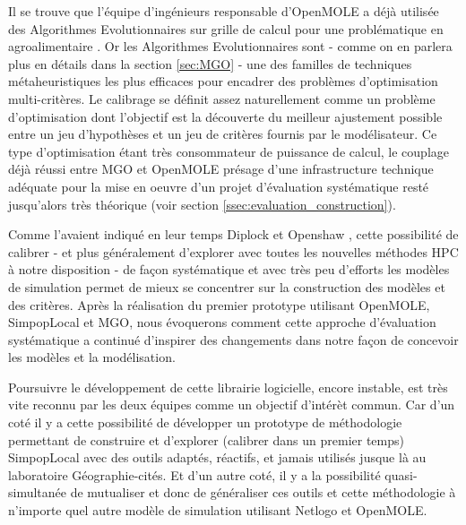 Il se trouve que l'équipe d'ingénieurs responsable d'OpenMOLE a déjà utilisée des Algorithmes Evolutionnaires sur grille de calcul pour une problématique en agroalimentaire \autocite{Mesmoudi2010}. Or les Algorithmes Evolutionnaires sont - comme on en parlera plus en détails dans la section \ref{sec:MGO} - une des familles de techniques métaheuristiques les plus efficaces pour encadrer des problèmes d'optimisation multi-critères. Le calibrage se définit assez naturellement comme un problème d'optimisation dont l'objectif est la découverte du meilleur ajustement possible entre un jeu d'hypothèses et un jeu de critères fournis par le modélisateur. Ce type d'optimisation étant très consommateur de puissance de calcul, le couplage déjà réussi entre MGO et OpenMOLE présage d'une infrastructure technique adéquate pour la mise en oeuvre d'un projet d'évaluation systématique resté jusqu'alors très théorique (voir section \ref{ssec:evaluation_construction}).

Comme l'avaient indiqué en leur temps Diplock et Openshaw \autocite{Diplock1996}, cette possibilité de calibrer - et plus généralement d'explorer avec toutes les nouvelles méthodes HPC à notre disposition - de façon systématique et avec très peu d'efforts les modèles de simulation permet de mieux se concentrer sur la construction des modèles et des critères. Après la réalisation du premier prototype utilisant OpenMOLE, SimpopLocal et MGO, nous évoquerons comment cette approche d'évaluation systématique a continué d'inspirer des changements dans notre façon de concevoir les modèles et la modélisation. %

Poursuivre le développement de cette librairie logicielle, encore instable, est très vite reconnu par les deux équipes comme un objectif d'intérèt commun. Car d'un coté il y a cette possibilité de développer un prototype de méthodologie permettant de construire et d'explorer (calibrer dans un premier temps) SimpopLocal avec des outils adaptés, réactifs, et jamais utilisés jusque là au laboratoire Géographie-cités. Et d'un autre coté, il y a la possibilité quasi-simultanée de mutualiser et donc de généraliser ces outils et cette méthodologie à n'importe quel autre modèle de simulation utilisant Netlogo et OpenMOLE.


